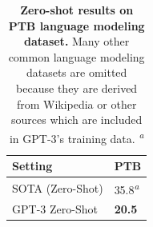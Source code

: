 
\begin{table}
    
    \centering
        \begin{tabular}{ll}
        \toprule
        Setting & PTB  \\ 
        \midrule
        SOTA (Zero-Shot) & 35.8\textsuperscript{\textit{a}} \\
        GPT-3 Zero-Shot & \textbf{20.5}\\
        \bottomrule
        \end{tabular}
        
    \caption{\textbf{Zero-shot results on PTB language modeling dataset.} Many other common language modeling datasets are omitted because they are derived from Wikipedia or other sources which are included in GPT-3's training data. \textsuperscript{\textit{a}}\cite{radford2019language}}
    \label{table:language}
\end{table}